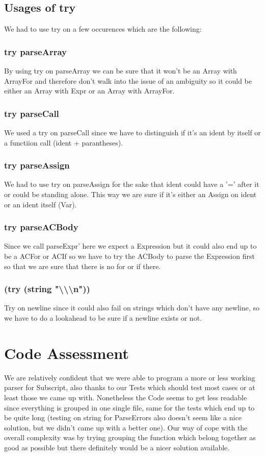 \documentclass[12pt,a4paper]{article}
\begin{document}
\subsection{Usages of try}
We had to use try on a few occurences which are the following:
\subsubsection{try parseArray}
By using try on parseArray we can be sure that it won't be an Array with ArrayFor and therefore don't walk into the issue of an ambiguity so it could be either an Array with Expr or an Array with ArrayFor.
\subsubsection{try parseCall}
We used a try on parseCall since we have to distinguish if it's an ident by itself or a functiion call (ident + parantheses).

\subsubsection{try parseAssign}
We had to use try on parseAssign for the sake that ident could have a '=' after it or could be standing alone.
This way we are sure if it's either an Assign on ident or an ident itself (Var).

\subsubsection{try parseACBody}
Since we call parseExpr' here we expect a Expression but it could also end up to be a ACFor or ACIf so we have to try the ACBody to parse the Expression first so that we are sure that there is no for or if there.

\subsubsection{(try (string "\textbackslash\textbackslash\textbackslash{n}"))}
Try on newline since it could also fail on strings which don't have any newline, so we have to do a lookahead to be sure if a newline exists or not.

\section{Code Assessment}

We are relatively confident that we were able to program a more or less working parser for Subscript, also thanks to our Tests which should test most cases or at least those we came up with.
Nonetheless the Code seems to get less readable since everything is grouped in one single file, same for the tests which end up to be quite long (testing on string for ParseErrors also doesn't seem like a nice solution, but we didn't came up with a better one).
Our way of cope with the overall complexity was by trying grouping the function which belong together as good as possible but there definitely would be a nicer solution available.
\end{document}
